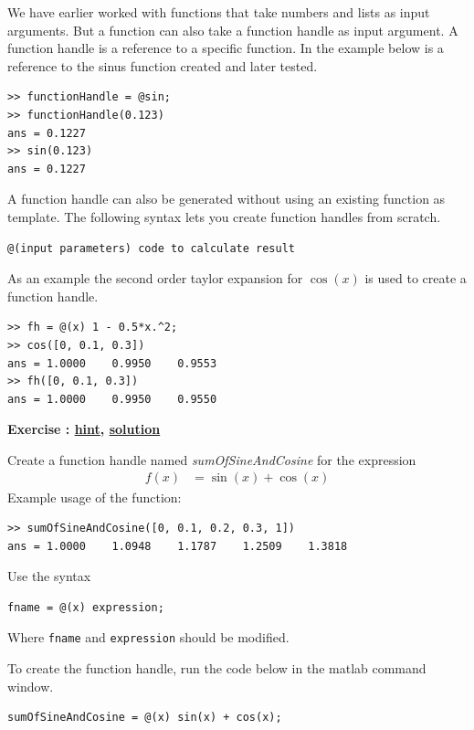 \documentclass[12pt,a4paper]{article}
\makeatletter
\newcommand{\linkdest}[1]{\Hy@raisedlink{\hypertarget{#1}{}}}
\newcounter{ex}
\numberwithin{ex}{section}
\newenvironment{ex}[1][]{%
\filbreak
\bigskip
\refstepcounter{ex}
\noindent
\textbf{\linkdest{\theex{}exercise}{}Exercise \theex{}: #1\hfill\hyperlink{\theex{}hint}{hint}, \hyperlink{\theex{}solution}{solution}}\par\noindent}{}
\makeatother
\begin{document}
We have earlier worked with functions that take numbers and lists 
as input arguments.
But a function can also take a function handle as input argument.
A function handle is a reference to a specific function. 
In the example below is a reference to the sinus function created 
and later tested.
%
\begin{lstlisting}
>> functionHandle = @sin;
>> functionHandle(0.123)
ans = 0.1227
>> sin(0.123)
ans = 0.1227
\end{lstlisting}
%
A function handle can also be generated without using an existing function as template.
The following syntax lets you create function handles from scratch.
%
\begin{lstlisting}
@(input parameters) code to calculate result
\end{lstlisting}
%
As an example the second order taylor expansion for $\cos(x)$ is used to create 
a function handle.
\begin{lstlisting}
>> fh = @(x) 1 - 0.5*x.^2;
>> cos([0, 0.1, 0.3])
ans = 1.0000    0.9950    0.9553
>> fh([0, 0.1, 0.3])
ans = 1.0000    0.9950    0.9550
\end{lstlisting}

\begin{ex}
Create a function handle named \emph{sumOfSineAndCosine} for the expression
\begin{align*}
f(x) & = \sin(x) + \cos(x)
\end{align*}
Example usage of the function:
\begin{lstlisting}
>> sumOfSineAndCosine([0, 0.1, 0.2, 0.3, 1])
ans = 1.0000    1.0948    1.1787    1.2509    1.3818
\end{lstlisting}
\begin{hint}
Use the syntax
\begin{lstlisting}
fname = @(x) expression;
\end{lstlisting}
Where \verb!fname! and \verb!expression! should be modified.
\end{hint}
\begin{sol}
To create the function handle, run the code below in the matlab command window.
\begin{lstlisting}
sumOfSineAndCosine = @(x) sin(x) + cos(x);
\end{lstlisting}
\end{sol}
\end{ex}
\end{document}
